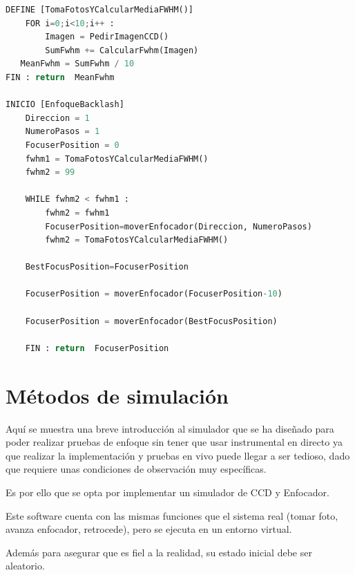 \begin{lstlisting}[language=python]
DEFINE [TomaFotosYCalcularMediaFWHM()]
    FOR i=0;i<10;i++ :  
        Imagen = PedirImagenCCD()
        SumFwhm += CalcularFwhm(Imagen)
   MeanFwhm = SumFwhm / 10
FIN : return  MeanFwhm

INICIO [EnfoqueBacklash]
    Direccion = 1
    NumeroPasos = 1
    FocuserPosition = 0
    fwhm1 = TomaFotosYCalcularMediaFWHM()
    fwhm2 = 99
    
    WHILE fwhm2 < fwhm1 :
        fwhm2 = fwhm1
        FocuserPosition=moverEnfocador(Direccion, NumeroPasos)
        fwhm2 = TomaFotosYCalcularMediaFWHM()
    
    BestFocusPosition=FocuserPosition
    
    FocuserPosition = moverEnfocador(FocuserPosition-10)
    
    FocuserPosition = moverEnfocador(BestFocusPosition)
    
    FIN : return  FocuserPosition   
\end{lstlisting} 


\section{Métodos de simulación}

Aquí se muestra una breve introducción al simulador que se ha diseñado para poder realizar pruebas de enfoque sin tener que usar instrumental en directo ya que realizar la implementación y pruebas en vivo puede llegar a ser tedioso, dado que requiere unas condiciones de observación muy específicas. 

Es por ello que se opta por implementar un simulador de CCD y Enfocador. 

Este software cuenta con las mismas funciones que el sistema real (tomar foto, avanza enfocador, retrocede), pero se ejecuta en un entorno virtual. 

Además para asegurar que es fiel a la realidad, su estado inicial debe ser aleatorio.

